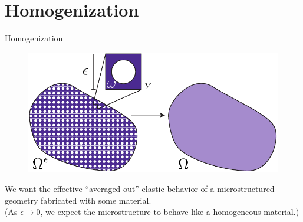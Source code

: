 \section{Homogenization}
\begin{frame}{Homogenization}
    \begin{figure}
        \includegraphics[width=.75\textwidth]{Images/homogenize.pdf}
    \end{figure}
    We want the effective ``averaged out'' elastic behavior of a microstructured
    geometry fabricated with some material. \\

    (As $\epsilon \to 0$, we expect the
    microstructure to behave like a homogeneous material.)
\end{frame}
